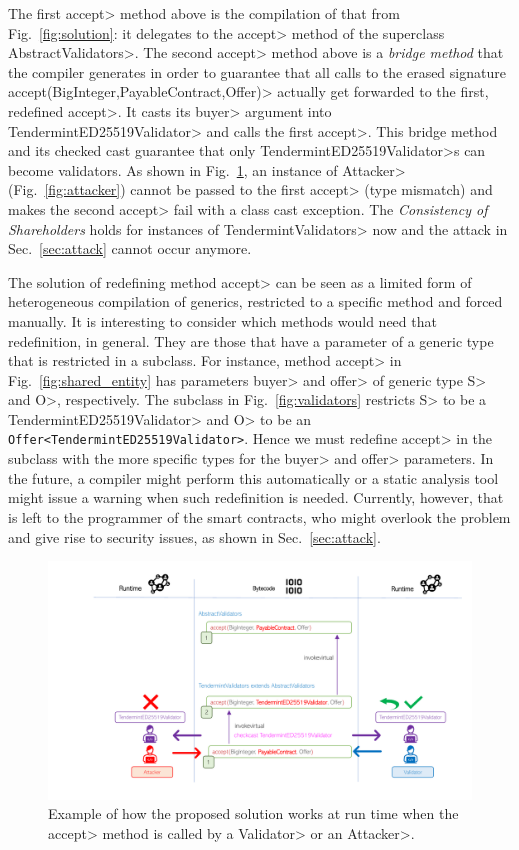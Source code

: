 \noindent
The first \<accept> method above is the compilation of that from Fig.~\ref{fig:solution}:
it delegates to the \<accept> method of the superclass \<AbstractValidators>. The second
\<accept> method above is a \emph{bridge method} that the compiler generates in order to guarantee
that all calls to the erased signature \<accept(BigInteger,PayableContract,Offer)> actually
get forwarded to the first, redefined \<accept>. It casts its \<buyer> argument
into \<TendermintED25519Validator> and calls the first \<accept>. This
bridge method and its checked cast guarantee that only \<TendermintED25519Validator>s
can become validators. As shown in Fig.~\ref{figure.solution},
an instance of \<Attacker> (Fig.~\ref{fig:attacker})
cannot be passed to the first \<accept> (type mismatch) and makes the second \<accept>
fail with a class cast exception. The \emph{Consistency of Shareholders} holds
for instances of \<TendermintValidators> now and the attack in Sec.~\ref{sec:attack} cannot occur
anymore.

The solution of redefining method \<accept> can be seen as a limited form of heterogeneous
compilation of generics, restricted to a specific method and forced manually.
It is interesting to consider which methods
would need that redefinition, in general. They are those that have a parameter of a generic type
that is restricted in a subclass. For instance, method \<accept> in
Fig.~\ref{fig:shared_entity} has parameters \<buyer> and \<offer> of generic type
\<S> and \<O>, respectively. The subclass in Fig.~\ref{fig:validators} restricts
\<S> to be a \<TendermintED25519Validator> and \<O> to be
an {\codesize\texttt{Offer<TendermintED25519Validator>}}. Hence we must redefine
\<accept> in the subclass with the more specific types for the \<buyer> and \<offer>
parameters. In the future, a compiler might perform this automatically or a static analysis
tool might issue a warning when such redefinition is needed. Currently, however, that is
left to the programmer of the smart contracts, who might overlook the problem
and give rise to security issues, as shown in Sec.~\ref{sec:attack}.

\begin{figure}[ht]
\centering
\includegraphics[width=.95\linewidth]{figures/solution}
\caption{Example of how the proposed solution works at run time when the \<accept> method is called by a \<Validator> or an \<Attacker>.}
\label{figure.solution}
\end{figure}

